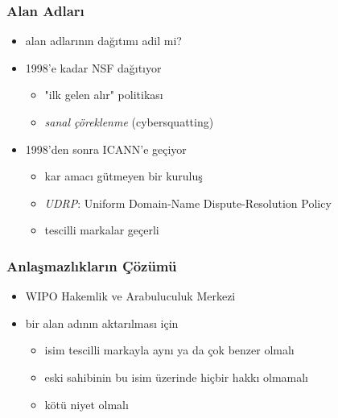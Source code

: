 \documentclass[dvipsnames]{beamer}
\theoremstyle{definition}
\theoremstyle{example}
\theoremstyle{plain}
\begin{document}
\begin{frame}
  \frametitle{Alan Adları}

  \begin{itemize}
    \item alan adlarının dağıtımı adil mi?

    \pause
    \bigskip
    \item 1998'e kadar NSF dağıtıyor
    \begin{itemize}
      \item "ilk gelen alır" politikası
      \item \emph{sanal çöreklenme} (cybersquatting)
    \end{itemize}
    
    \item 1998'den sonra ICANN'e geçiyor
    \begin{itemize}
      \item kar amacı gütmeyen bir kuruluş
      \item \emph{UDRP}: Uniform Domain-Name Dispute-Resolution Policy
      \item tescilli markalar geçerli
    \end{itemize}
  \end{itemize}
\end{frame}

\begin{frame}
  \frametitle{Anlaşmazlıkların Çözümü}

  \begin{itemize}
    \item WIPO Hakemlik ve Arabuluculuk Merkezi

    \medskip
    \item bir alan adının aktarılması için
    \begin{itemize}
      \item isim tescilli markayla aynı ya da çok benzer olmalı
      \item eski sahibinin bu isim üzerinde hiçbir hakkı olmamalı
      \item kötü niyet olmalı
    \end{itemize}
  \end{itemize}
\end{frame}
\end{document}
